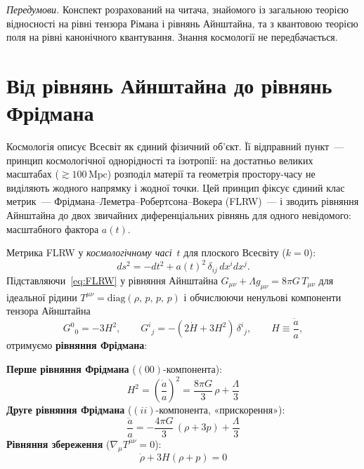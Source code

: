 \documentclass[12pt, a4paper]{article}
\begin{document}
\bigskip
\noindent
\textit{Передумови.} Конспект розрахований на читача, знайомого із
загальною теорією відносності на рівні тензора Рімана і рівнянь
Айнштайна, та з квантовою теорією поля на рівні канонічного
квантування. Знання космології не передбачається.

\newpage

\section{Від рівнянь Айнштайна до рівнянь Фрідмана}
\label{sec:friedmann}

Космологія описує Всесвіт як єдиний фізичний об'єкт. Її відправний
пункт~--- принцип космологічної однорідності та ізотропії: на
достатньо великих масштабах ($\gtrsim 100\,\mathrm{Mpc}$) розподіл
матерії та геометрія простору-часу не виділяють жодного напрямку і
жодної точки. Цей принцип фіксує єдиний клас метрик~---
Фрідмана--Леметра--Робертсона--Вокера (FLRW)~--- і зводить
рівняння Айнштайна до двох звичайних диференціальних рівнянь для
одного невідомого: масштабного фактора $a(t)$.

Метрика FLRW у \emph{космологічному часі}~$t$ для плоского Всесвіту
($k = 0$):
\begin{equation}\label{eq:FLRW}
  ds^2 = -dt^2 + a(t)^2\,\delta_{ij}\,dx^i dx^j.
\end{equation}
Підставляючи~\eqref{eq:FLRW} у рівняння Айнштайна
$G_{\mu\nu} + \Lambda g_{\mu\nu} = 8\pi G\,T_{\mu\nu}$
для ідеальної рідини
$T^{\mu\nu} = \mathrm{diag}(\rho,\,p,\,p,\,p)$
і обчислюючи ненульові компоненти тензора Айнштайна
\begin{equation*}
  G^0{}_0 = -3H^2,
  \qquad
  G^i{}_j = -(2\dot H + 3H^2)\,\delta^i{}_j,
  \qquad
  H \equiv \frac{\dot a}{a},
\end{equation*}
отримуємо \textbf{рівняння Фрідмана}:

\begin{keybox}
\textbf{Перше рівняння Фрідмана} ($(00)$-компонента):
\begin{equation}\label{eq:F1}
  H^2 = \left(\frac{\dot a}{a}\right)^2
      = \frac{8\pi G}{3}\,\rho + \frac{\Lambda}{3}
\end{equation}
\textbf{Друге рівняння Фрідмана} ($(ii)$-компонента, «прискорення»):
\begin{equation}\label{eq:F2}
  \frac{\ddot a}{a} = -\frac{4\pi G}{3}\,(\rho + 3p) + \frac{\Lambda}{3}
\end{equation}
\textbf{Рівняння збереження} ($\nabla_\mu T^{\mu\nu} = 0$):
\begin{equation}\label{eq:conservation_low}
  \dot\rho + 3H(\rho + p) = 0
\end{equation}
\end{keybox}
\end{document}
